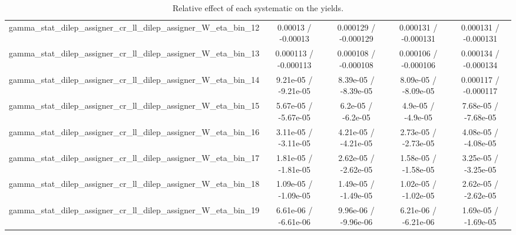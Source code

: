 \documentclass[10pt]{article}
\begin{document}
\begin{table}[htbp]
\begin{center}
\begin{tabular}{|c|c|c|c|c|}
  gamma_stat_dilep_assigner_cr_ll_dilep_assigner_W_eta_bin_12 & 0.00013 / -0.00013 & 0.000129 / -0.000129 & 0.000131 / -0.000131 & 0.000131 / -0.000131 \\ 
  gamma_stat_dilep_assigner_cr_ll_dilep_assigner_W_eta_bin_13 & 0.000113 / -0.000113 & 0.000108 / -0.000108 & 0.000106 / -0.000106 & 0.000134 / -0.000134 \\ 
  gamma_stat_dilep_assigner_cr_ll_dilep_assigner_W_eta_bin_14 & 9.21e-05 / -9.21e-05 & 8.39e-05 / -8.39e-05 & 8.09e-05 / -8.09e-05 & 0.000117 / -0.000117 \\ 
  gamma_stat_dilep_assigner_cr_ll_dilep_assigner_W_eta_bin_15 & 5.67e-05 / -5.67e-05 & 6.2e-05 / -6.2e-05 & 4.9e-05 / -4.9e-05 & 7.68e-05 / -7.68e-05 \\ 
  gamma_stat_dilep_assigner_cr_ll_dilep_assigner_W_eta_bin_16 & 3.11e-05 / -3.11e-05 & 4.21e-05 / -4.21e-05 & 2.73e-05 / -2.73e-05 & 4.08e-05 / -4.08e-05 \\ 
  gamma_stat_dilep_assigner_cr_ll_dilep_assigner_W_eta_bin_17 & 1.81e-05 / -1.81e-05 & 2.62e-05 / -2.62e-05 & 1.58e-05 / -1.58e-05 & 3.25e-05 / -3.25e-05 \\ 
  gamma_stat_dilep_assigner_cr_ll_dilep_assigner_W_eta_bin_18 & 1.09e-05 / -1.09e-05 & 1.49e-05 / -1.49e-05 & 1.02e-05 / -1.02e-05 & 2.62e-05 / -2.62e-05 \\ 
  gamma_stat_dilep_assigner_cr_ll_dilep_assigner_W_eta_bin_19 & 6.61e-06 / -6.61e-06 & 9.96e-06 / -9.96e-06 & 6.21e-06 / -6.21e-06 & 1.69e-05 / -1.69e-05 \\ 
\hline 
\end{tabular} 
\caption{Relative effect of each systematic on the yields.} 
\end{center} 
\end{table} 
\end{document}
